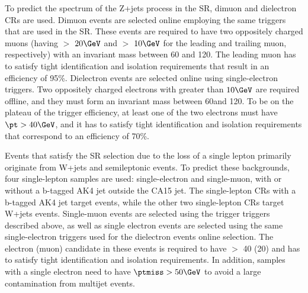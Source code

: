 To predict the \MET spectrum of the Z+jets process in the SR, dimuon and dielectron CRs are used.
Dimuon events are selected online employing the same \MET triggers that are used in the SR.
These events are required to have two oppositely charged muons (having
\pt $>$ $20\GeV$ and \pt $>$ $10\GeV$ for the leading and trailing
muon, respectively) with an invariant mass between 60 and 120\GeV.
The leading muon has to satisfy tight identification and isolation requirements that result in an efficiency of 95\%.
Dielectron events are selected online using single-electron triggers. %
Two oppositely charged electrons with \pt greater than $10\GeV$ are required offline, and they must form an invariant mass between 60\GeV and 120\GeV.
To be on the plateau of the trigger efficiency, at least one of the two electrons must have $\pt>40\GeV$, and it has to satisfy tight identification and isolation requirements that correspond to an efficiency of 70\%.

Events that satisfy the SR selection due to the loss of a single lepton primarily originate from W+jets and semileptonic \ttbar events.
To predict these backgrounds, four single-lepton samples are used: single-electron and single-muon, with or without a b-tagged AK4 jet outside the CA15 jet.
The single-lepton CRs with a b-tagged AK4 jet target \ttbar events, while the other two single-lepton CRs target W+jets events.
Single-muon events are selected using the \MET trigger triggers described above, as well as single electron events are selected using the same single-electron triggers used for the dielectron events online selection.
The electron (muon) candidate in these events is required to have \pt $>$ 40 (20) \GeV and has to satisfy tight identification and isolation requirements.
In addition, samples with a single electron need to have $\ptmiss>50\GeV$ to avoid a large contamination from multijet events.

